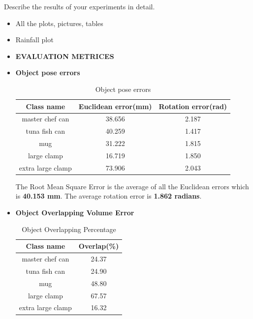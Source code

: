 \documentclass[report.tex]{subfiles}
\begin{document}
    Describe the results of your experiments in detail.
    \begin{itemize}
        \item All the plots, pictures, tables
        \item Rainfall plot
    \end{itemize}
    \begin{itemize}
    
    
    

    \item \textbf{EVALUATION METRICES}
    \item \textbf{Object pose errors}
        
\begin{table}[htbp]
    \centering
    \begin{tabular}{|c|c|c|}  %
        \hline  %
        Class name & Euclidean error(mm) & Rotation error(rad)  \\  %
        \hline  %
        master chef can & 38.656 & 2.187 \\
        tuna fish can & 40.259 & 1.417 \\
        mug & 31.222 & 1.815 \\
        large clamp & 16.719 & 1.850 \\
        extra large clamp & 73.906 & 2.043 \\
        \hline  %
    \end{tabular}
    \caption{Object pose errors}
    \label{tab:Object_pose_errors}
\end{table}
The Root Mean Square Error is the average of all the Euclidean errors which is \textbf{40.153 mm}.
The average rotation error is \textbf{1.862 radians}.

\item \textbf{Object Overlapping Volume Error}
\begin{table}[htbp]
    \centering
    \begin{tabular}{|c|c|}  %
        \hline  %
        Class name & Overlap(\%)\\  %
        \hline  %
        master chef can & 24.37 \\
        tuna fish can & 24.90 \\
        mug & 48.80 \\
        large clamp & 67.57 \\
        extra large clamp & 16.32 \\
        \hline  %
    \end{tabular}
    \caption{Object Overlapping Percentage}
    \label{tab:Object_Volume_Error}
\end{table}


\end{itemize}
\end{document}
